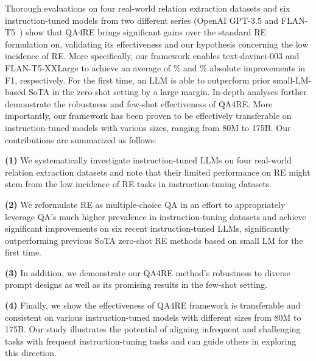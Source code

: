 Thorough evaluations on four real-world relation extraction datasets and six instruction-tuned models from two different series (OpenAI GPT-3.5 and FLAN-T5~\cite{ChungFlanT5}) show that QA4RE brings significant gains over the standard RE formulation on, validating its effectiveness and our hypothesis concerning the low incidence of RE.
More specifically, our framework enables text-davinci-003 and FLAN-T5-XXLarge to achieve an average of \% and \% absolute improvements in F1, respectively.
For the first time, an LLM is able to outperform prior small-LM-based SoTA in the zero-shot setting by a large margin.
In-depth analyses further demonstrate the robustness and few-shot effectiveness of QA4RE. 
More importantly, our framework has been proven to be effectively transferable on instruction-tuned models with various sizes, ranging from 80M to 175B.
Our contributions are summarized as follows:

\noindent
\textbf{(1)}
We systematically investigate instruction-tuned LLMs on four real-world relation extraction datasets and note that their limited performance on RE might stem from the low incidence of RE tasks in instruction-tuning datasets.

\noindent
\textbf{(2)}
We reformulate RE as multiple-choice QA in an effort to appropriately leverage QA's much higher prevalence in instruction-tuning datasets and achieve significant improvements on six recent instruction-tuned LLMs, significantly outperforming previous SoTA zero-shot RE methods based on small LM for the first time.

\noindent
\textbf{(3)}
In addition, we demonstrate our QA4RE method's robustness to diverse prompt designs as well as its promising results in the few-shot setting. 


\noindent
\textbf{(4)}
Finally, we show the effectiveness of QA4RE framework is transferable and consistent on various instruction-tuned models with different sizes from 80M to 175B.
Our study illustrates the potential of aligning infrequent and challenging tasks with frequent instruction-tuning tasks and can guide others in exploring this direction.






